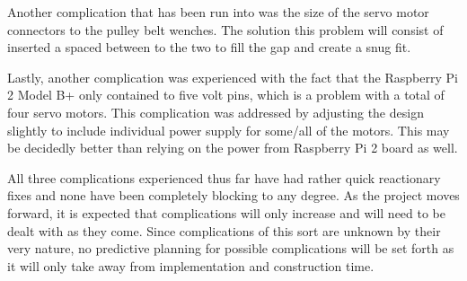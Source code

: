 \documentclass[letterpaper, 10 pt, conference]{ieeeconf}
\begin{document}
Another complication that has been run into was the size of the servo motor connectors to the pulley belt wenches.  The solution this problem will consist of inserted a spaced between to the two to fill the gap and create a snug fit.  

Lastly, another complication was experienced with the fact that the Raspberry Pi 2 Model B+ only contained to five volt pins, which is a problem with a total of four servo motors.  This complication was addressed by adjusting the design slightly to include individual power supply for some/all of the motors.  This may be decidedly better than relying on the power from Raspberry Pi 2 board as well. 

All three complications experienced thus far have had rather quick reactionary fixes and none have been completely blocking to any degree.  As the project moves forward, it is expected that complications will only increase and will need to be dealt with as they come.  Since complications of this sort are unknown by their very nature, no predictive planning for possible complications will be set forth as it will only take away from implementation and construction time.  
\end{document}
